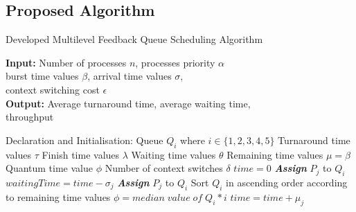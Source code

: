 \documentclass[conference]{IEEEtran}
\begin{document}
\subsection{Proposed Algorithm}
\begin{algorithm}[H]
    \caption{Developed Multilevel Feedback Queue Scheduling Algorithm}
    \hspace*{\algorithmicindent} \textbf{Input:} Number of processes $n$, processes priority $\alpha$\\
    \hspace*{\algorithmicindent} burst time values $\beta$, arrival time values $\sigma$, \\
    \hspace*{\algorithmicindent} context switching cost $\epsilon$\\
    \hspace*{\algorithmicindent} \textbf{Output:} Average turnaround time, average waiting time,\\
    \hspace*{\algorithmicindent} throughput
    \begin{algorithmic}[1]
    \Statex Declaration and Initialisation:
    \State Queue $Q_{i}$ where $i \in \{1, 2, 3, 4, 5\}$
    \State Turnaround time values $\tau$
    \State Finish time values $\lambda$
    \State Waiting time values $\theta$
    \State Remaining time values $\mu = \beta$
    \State Quantum time value $\phi$
    \State Number of context switches $\delta$
        \State$time = 0$
                        \State \textit{\textbf{Assign}} $P_{j}$ to $Q_{i}$
                    \EndIf
                    \State $waitingTime = time - \sigma_{j}$
                        \State \textit{\textbf{Assign}} $P_{j}$ to $Q_{i}$
                    \EndIf
                \EndFor
                \State Sort $Q_{i}$ in ascending order according to remaining time values
                \State $\phi = median\; value\; of\; Q_{i} * i$
                \algrenewcommand{}
                        \State $time = time + \mu_{j}$

\end{algorithmic}
\end{algorithm}
\end{document}
